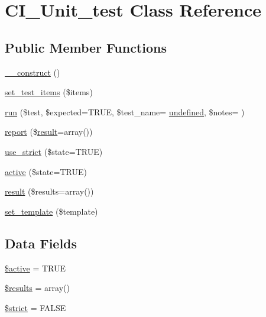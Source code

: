 \hypertarget{class_c_i___unit__test}{}\section{C\+I\+\_\+\+Unit\+\_\+test Class Reference}
\label{class_c_i___unit__test}
\subsection*{Public Member Functions}
\begin{DoxyCompactItemize}
\item 
\hyperlink{class_c_i___unit__test_a095c5d389db211932136b53f25f39685}{\+\_\+\+\_\+construct} ()
\item 
\hyperlink{class_c_i___unit__test_a78e364204a36821e23124ae97d447aa3}{set\+\_\+test\+\_\+items} (\$items)
\item 
\hyperlink{class_c_i___unit__test_a4589c9182b5cd90f438b0ff9beea4aab}{run} (\$test, \$expected=T\+R\+U\+E, \$test\+\_\+name= \textquotesingle{}\hyperlink{assets_2js_2jquery-1_811_82_8min_8js_ae21cc36bf0d65014c717a481a3f8a468}{undefined}\textquotesingle{}, \$notes= \textquotesingle{}\textquotesingle{})
\item 
\hyperlink{class_c_i___unit__test_a339c46eabb709c1c492bc264c9634171}{report} (\$\hyperlink{class_c_i___unit__test_adcfdd404b2f2610e0690b4beb7786ce5}{result}=array())
\item 
\hyperlink{class_c_i___unit__test_a3b12a79f69fab4221a0b887bdac1ba83}{use\+\_\+strict} (\$state=T\+R\+U\+E)
\item 
\hyperlink{class_c_i___unit__test_ac7b3030630fc7dd31513c75cf27c1a8a}{active} (\$state=T\+R\+U\+E)
\item 
\hyperlink{class_c_i___unit__test_adcfdd404b2f2610e0690b4beb7786ce5}{result} (\$results=array())
\item 
\hyperlink{class_c_i___unit__test_ae65d1ab2a626d4ddfda31befc2b347f6}{set\+\_\+template} (\$template)
\end{DoxyCompactItemize}
\subsection*{Data Fields}
\begin{DoxyCompactItemize}
\item 
\hyperlink{class_c_i___unit__test_aacd1fa47b7ea59451aff98beca4360ae}{\$active} = T\+R\+U\+E
\item 
\hyperlink{class_c_i___unit__test_a233d12bd8b6d3453e9a7a3f0b8c31db2}{\$results} = array()
\item 
\hyperlink{class_c_i___unit__test_a856bf794dded1ba70be4dfae635a1b06}{\$strict} = F\+A\+L\+S\+E
\end{DoxyCompactItemize}
